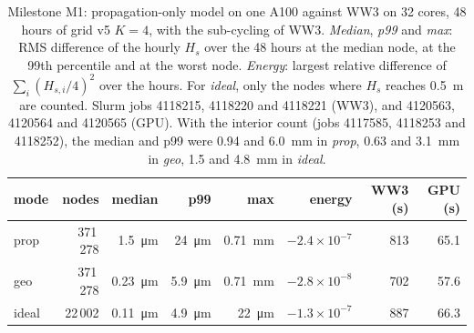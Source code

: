 \documentclass[11pt,a4paper]{article}
\begin{document}
\begin{table}[H]
\centering\small
\begin{tabular}{lrrrrrrr}
\toprule
mode & nodes & median & p99 & max & energy & WW3 (s) & GPU (s) \\
\midrule
prop & 371\,278 & \SI{1.5}{\micro\metre} & \SI{24}{\micro\metre} & \SI{0.71}{mm} & $-2.4\times10^{-7}$ & 813 & 65.1 \\
geo & 371\,278 & \SI{0.23}{\micro\metre} & \SI{5.9}{\micro\metre} & \SI{0.71}{mm} & $-2.8\times10^{-8}$ & 702 & 57.6 \\
ideal & 22\,002 & \SI{0.11}{\micro\metre} & \SI{4.9}{\micro\metre} & \SI{22}{\micro\metre} & $-1.3\times10^{-7}$ & 887 & 66.3 \\
\bottomrule
\end{tabular}
\caption{Milestone M1: propagation-only model on one A100 against WW3 on 32
cores, 48 hours of grid v5 $K=4$, with the sub-cycling of WW3.
\emph{Median}, \emph{p99} and \emph{max}: RMS difference of the hourly
$H_s$ over the 48 hours at the median node, at the 99th percentile and at
the worst node.
\emph{Energy}: largest relative difference of $\sum_i (H_{s,i}/4)^2$ over
the hours.
For \emph{ideal}, only the nodes where $H_s$ reaches \SI{0.5}{m} are
counted.
Slurm jobs 4118215, 4118220 and 4118221 (WW3), and 4120563, 4120564 and
4120565 (GPU). With the interior count (jobs 4117585, 4118253 and
4118252), the median and p99 were 0.94 and \SI{6.0}{mm} in \emph{prop},
0.63 and \SI{3.1}{mm} in \emph{geo}, 1.5 and \SI{4.8}{mm} in
\emph{ideal}.}
\label{tab:m1}
\end{table}
\end{document}
